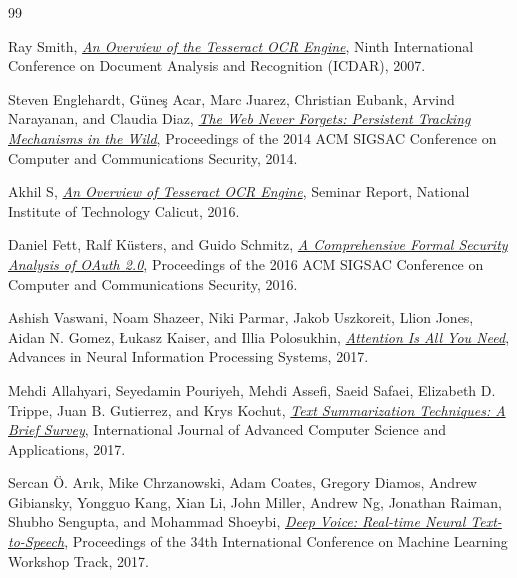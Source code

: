 \documentclass[12pt, a4paper]{report}
\begin{document}
\begin{thebibliography}{99}

  Ray Smith,
  \textit{\href{https://drive.google.com/file/d/1j8N7SkeDjVg5xpB3XX8Mm9ixMqXkSJ19/view?usp=drive_link}{An Overview of the Tesseract OCR Engine}}, Ninth International Conference on Document Analysis and Recognition (ICDAR), 2007.

  Steven Englehardt, G\"une\c{s} Acar, Marc Juarez, Christian Eubank, Arvind Narayanan, and Claudia Diaz,
  \textit{\href{https://drive.google.com/file/d/1lLDbKDBJMXgEY3nO3cRfYeHnitykOAvy/view?usp=drive_link}{The Web Never Forgets: Persistent Tracking Mechanisms in the Wild}}, Proceedings of the 2014 ACM SIGSAC Conference on Computer and Communications Security, 2014.

  Akhil S,
  \textit{\href{https://drive.google.com/file/d/1Y_iO3LfxYAve75SkbkwvU8KDQohasRge/view?usp=drive_link}{An Overview of Tesseract OCR Engine}}, Seminar Report, National Institute of Technology Calicut, 2016.

  Daniel Fett, Ralf K\"usters, and Guido Schmitz,
  \textit{\href{https://drive.google.com/file/d/1VvIbIezH9r2YAgO4qY0M9V5rtIxDM6ZE/view?usp=drive_link}{A Comprehensive Formal Security Analysis of OAuth 2.0}}, Proceedings of the 2016 ACM SIGSAC Conference on Computer and Communications Security, 2016.

  Ashish Vaswani, Noam Shazeer, Niki Parmar, Jakob Uszkoreit, Llion Jones, Aidan N. Gomez, {\L}ukasz Kaiser, and Illia Polosukhin,
  \textit{\href{https://drive.google.com/file/d/186znXnfq8rV57agYSp1ZDJzgxlFMArCw/view?usp=drive_link}{Attention Is All You Need}}, Advances in Neural Information Processing Systems, 2017.

  Mehdi Allahyari, Seyedamin Pouriyeh, Mehdi Assefi, Saeid Safaei, Elizabeth D. Trippe, Juan B. Gutierrez, and Krys Kochut,
  \textit{\href{https://drive.google.com/file/d/1gdCMbg6FfpO6nH9Gn9d9WY95y9TzAtBk/view?usp=drive_link}{Text Summarization Techniques: A Brief Survey}}, International Journal of Advanced Computer Science and Applications, 2017.

  Sercan \"O. Ar\i k, Mike Chrzanowski, Adam Coates, Gregory Diamos, Andrew Gibiansky, Yongguo Kang, Xian Li, John Miller, Andrew Ng, Jonathan Raiman, Shubho Sengupta, and Mohammad Shoeybi,
  \textit{\href{https://drive.google.com/file/d/1B2xzT1BBzqQ5HsL1-TdlqGLlN-cJbF5s/view?usp=drive_link}{Deep Voice: Real-time Neural Text-to-Speech}}, Proceedings of the 34th International Conference on Machine Learning Workshop Track, 2017.


\end{thebibliography}
\end{document}
